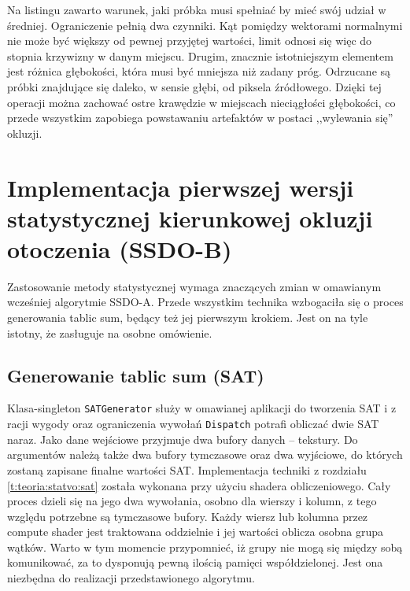 		Na listingu zawarto warunek, jaki próbka musi spełniać by mieć swój udział w średniej. Ograniczenie pełnią dwa czynniki. Kąt pomiędzy wektorami normalnymi nie może być większy od pewnej przyjętej wartości, limit odnosi się więc do stopnia krzywizny w danym miejscu. Drugim, znacznie istotniejszym elementem jest różnica głębokości, która musi być mniejsza niż zadany próg. Odrzucane są próbki znajdujące się daleko, w sensie głębi, od piksela źródłowego. Dzięki tej operacji można zachować ostre krawędzie w miejscach nieciągłości głębokości, co przede wszystkim zapobiega powstawaniu artefaktów w postaci ,,wylewania się'' okluzji.
	
	\section{Implementacja pierwszej wersji statystycznej kierunkowej okluzji otoczenia (SSDO-B)}
	\label{t:impl:b}
	
	
	
	Zastosowanie metody statystycznej wymaga znaczących zmian w omawianym wcześniej algorytmie SSDO-A. Przede wszystkim technika wzbogaciła się o proces generowania tablic sum, będący też jej pierwszym krokiem. Jest on na tyle istotny, że zasługuje na osobne omówienie.
	
	\subsection{Generowanie tablic sum (SAT)}
	\label{t:impl:b:sat}
	
		Klasa-singleton \texttt{SATGenerator} służy w omawianej aplikacji do tworzenia SAT i z racji wygody oraz ograniczenia wywołań \texttt{Dispatch} potrafi obliczać dwie SAT naraz. Jako dane wejściowe przyjmuje dwa bufory danych -- tekstury. Do argumentów należą także dwa bufory tymczasowe oraz dwa wyjściowe, do których zostaną zapisane finalne wartości SAT. Implementacja techniki z rozdziału \ref{t:teoria:statvo:sat} została wykonana przy użyciu shadera obliczeniowego. Cały proces dzieli się na jego dwa wywołania, osobno dla wierszy i kolumn, z tego względu potrzebne są tymczasowe bufory. Każdy wiersz lub kolumna przez compute shader jest traktowana oddzielnie i jej wartości oblicza osobna grupa wątków. Warto w tym momencie przypomnieć, iż grupy nie mogą się między sobą komunikować, za to dysponują pewną ilością pamięci współdzielonej. Jest ona niezbędna do realizacji przedstawionego algorytmu. 
		
